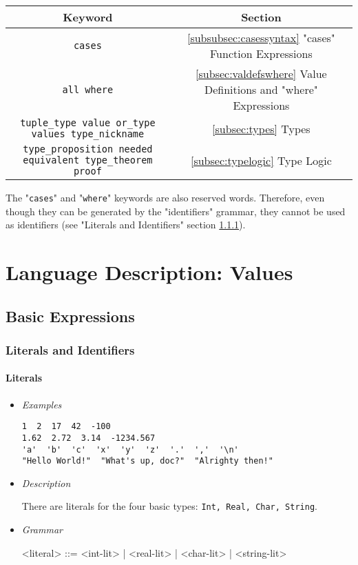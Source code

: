\documentclass{article}
\begin{document}
\begin{center}
\begin{tabular}{ |c|c| }
\hline
Keyword & Section
\\
\hline
\hline
\verb|cases| & \ref{subsubsec:casessyntax} "cases" Function Expressions
\\
\hline
\verb|all where| & \ref{subsec:valdefswhere}
Value Definitions and "where" Expressions
\\
\hline
\verb|tuple_type value or_type values type_nickname| &
\ref{subsec:types} Types
\\
\hline
\verb|type_proposition needed equivalent type_theorem proof| &
{\ref{subsec:typelogic} Type Logic}
\\
\hline
\end{tabular}
\end{center}
The "\verb|cases|" and "\verb|where|" keywords are also
reserved words. Therefore, even though they can be generated by the
"identifiers" grammar, they cannot be used as identifiers (see "Literals and
Identifiers" section \ref{subsubsec:litsandidents}).

\newpage
\section{Language Description: Values}

\subsection{Basic Expressions}

\subsubsection{Literals and Identifiers}
\label{subsubsec:litsandidents}

\paragraph{Literals}
\begin{itemize}

\item \textit{Examples}
\begin{verbatim}
1  2  17  42  -100
1.62  2.72  3.14  -1234.567
'a'  'b'  'c'  'x'  'y'  'z'  '.'  ','  '\n'
"Hello World!"  "What's up, doc?"  "Alrighty then!"
\end{verbatim}

\item \textit{Description}

There are literals for the four basic types: \texttt{Int, Real, Char, String}.

\item \textit{Grammar}
\begin{grammar}
<literal> ::= <int-lit> | <real-lit> | <char-lit> | <string-lit>
\end{grammar}

\end{itemize}
\end{document}
